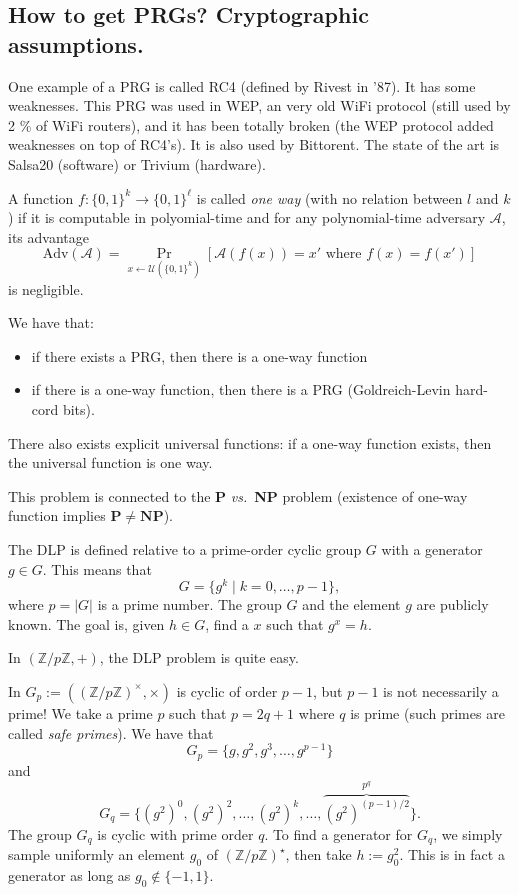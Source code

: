 \documentclass[./main]{subfiles}
\begin{document}
  \subsection{How to get PRGs? Cryptographic assumptions.}

  One example of a PRG is called RC4 (defined by Rivest in '87).
  It has some weaknesses.
  This PRG was used in WEP, an very old WiFi protocol (still used by 2 \% of WiFi routers), and it has been totally broken (the WEP protocol added weaknesses  on top of RC4's).
  It is also used by Bittorent.
  The state of the art is Salsa20 (software) or Trivium (hardware).

  \begin{defn}
    A function $f : \{0,1\}^k \to \{0,1\}^\ell$ is called \textit{one way} (with no relation between $l$ and $k$ ) if it is computable in polyomial-time and 
    for any polynomial-time adversary $\mathcal{A}$, its advantage \[
      \mathrm{Adv}(\mathcal{A}) = \Pr_{x \gets \mathcal{U}(\{0,1\}^k)}[\mathcal{A}(f(x)) = x' \text{ where } f(x) = f(x') ]
    \]
    is negligible.
  \end{defn}

  We have that:
  \begin{itemize}
    \item if there exists a PRG, then there is a one-way function
    \item if there is a one-way function, then there is a PRG (Goldreich-Levin hard-cord bits).
  \end{itemize}
  There also exists explicit universal functions: if a one-way function exists, then the universal function is one way.

  This problem is connected to the $\mathbf{P}$ \textit{vs.}\ \textbf{NP} problem (existence of one-way function implies $\mathbf{P} \neq \mathbf{NP}$).

  \begin{defn}
    The DLP is defined relative to a prime-order cyclic group $G$ with a generator~$g \in G$.
    This means that \[
    G = \{g^k  \mid k = 0, \ldots, p - 1\} 
    ,\] 
    where $p = |G|$ is a prime number. The group $G$ and the element $g$ are publicly known.
    The goal is, given $h \in G$, find a $x$ such that $g^x = h$.
  \end{defn}

  \begin{exm}
    In $(\mathds{Z} / p \mathds{Z}, +)$, the DLP problem is quite easy.

    In $G_p := ((\mathds{Z} / p \mathds{Z})^\times, \times)$ is cyclic of order $p-1$, but $p-1$ is not necessarily a prime!
    We take a prime $p$ such that $p = 2q + 1$ where $q$ is prime (such primes are called \textit{safe primes}).
    We have that 
    \[
      G_p = \{g, g^2, g^3, \ldots, g^{p-1}\}
    \] and \[G_q = \{(g^2)^0, (g^2)^2, \ldots, (g^2)^k, \ldots, \overbrace{(g^2)^{(p-1) / 2}}^{p^q}\} 
    .\] 
    The group $G_q$ is cyclic with prime order $q$. To find a generator for $G_q$, we simply sample uniformly an element $g_0$ of $(\mathds{Z} / p \mathds{Z})^\star$, then take $h := g_0^2$.
    This is in fact a generator as long as $g_0 \not\in \{-1, 1\}$.
  \end{exm}
\end{document}
